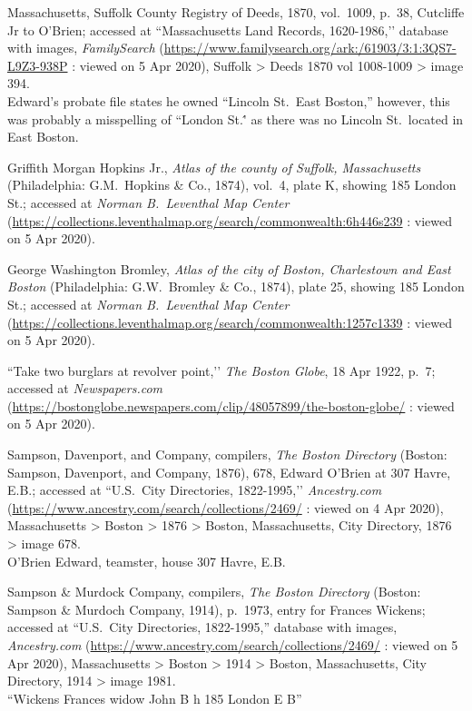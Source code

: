 \begin{thebibliography}{999}
	Massachusetts, Suffolk County Registry of Deeds, 1870, vol.\ 1009, p.\ 38, Cutcliffe Jr to O’Brien; accessed at ``Massachusetts Land Records, 1620-1986,’’ database with images, \textit{FamilySearch} (\url{https://www.familysearch.org/ark:/61903/3:1:3QS7-L9Z3-938P} : viewed on 5 Apr 2020), Suffolk > Deeds 1870 vol 1008-1009 > image 394.\\
	Edward's probate file states he owned ``Lincoln St.\  East Boston,'' however, this was probably a misspelling of ``London St.\'' as there was no Lincoln St.\ located in East Boston.\cite{EastBostonStreets}
	
	Griffith Morgan Hopkins Jr., \textit{Atlas of the county of Suffolk, Massachusetts} (Philadelphia: G.M.\ Hopkins \& Co., 1874), vol.\ 4, plate K, showing 185 London St.; accessed at \textit{Norman B.\ Leventhal Map Center} (\url{https://collections.leventhalmap.org/search/commonwealth:6h446s239} : viewed on 5 Apr 2020).
	
	George Washington Bromley, \textit{Atlas of the city of Boston, Charlestown and East Boston} (Philadelphia: G.W.\ Bromley \& Co., 1874), plate 25, showing 185 London St.; accessed at \textit{Norman B.\ Leventhal Map Center} (\url{https://collections.leventhalmap.org/search/commonwealth:1257c1339} : viewed on 5 Apr 2020).
	
	``Take two burglars at revolver point,’’ \textit{The Boston Globe}, 18 Apr 1922, p.\ 7; accessed at \textit{Newspapers.com} (\url{https://bostonglobe.newspapers.com/clip/48057899/the-boston-globe/} : viewed on 5 Apr 2020).
	
	Sampson, Davenport, and Company, compilers, \textit{The Boston Directory} (Boston: Sampson, Davenport, and Company, 1876), 678, Edward O’Brien at 307 Havre, E.B.; accessed at ``U.S.\ City Directories, 1822-1995,’’ \textit{Ancestry.com} (\url{https://www.ancestry.com/search/collections/2469/} : viewed on 4 Apr 2020), Massachusetts > Boston > 1876 > Boston, Massachusetts, City Directory, 1876 > image 678.\\
	O’Brien Edward, teamster, house 307 Havre, E.B.
	
	Sampson \& Murdock Company, compilers, \textit{The Boston Directory} (Boston: Sampson \& Murdoch Company, 1914), p.\ 1973, entry for Frances Wickens; accessed at ``U.S.\ City Directories, 1822-1995,'' database with images, \textit{Ancestry.com} (\url{https://www.ancestry.com/search/collections/2469/} : viewed on 5 Apr 2020), Massachusetts > Boston > 1914 > Boston, Massachusetts, City Directory, 1914 > image 1981.\\
	``Wickens Frances widow John B h 185 London E B''
	

\end{thebibliography}

